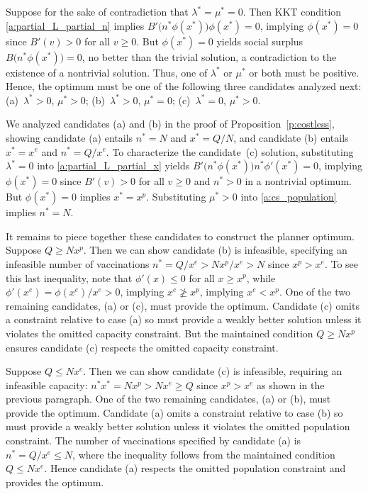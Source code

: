 \documentclass[12pt]{article}
\newcommand{\efficacy}{\phi}
\newcommand{\benefit}{B}
\newcommand{\xunit}{x^{e}}
\newcommand{\xpeak}{x^{p}}
\begin{document}
Suppose for the sake of contradiction that $\lambda^* = \mu^* =
0$. Then KKT condition \eqref{a:partial_L_partial_n} implies
$\benefit' \! \bigl( n^* \efficacy(x^*) \bigr) \efficacy(x^*) = 0$,
implying $\efficacy(x^*) = 0$ since $\benefit'(v) > 0$ for all $v \geq
0$. But $\efficacy(x^*) = 0$ yields social surplus $\benefit \bigl(n^*
\efficacy(x^*) \bigr) = 0$, no better than the trivial solution, a
contradiction to the existence of a nontrivial solution. Thus, one of
$\lambda^*$ or $\mu^*$ or both must be positive. Hence, the optimum
must be one of the following three candidates analyzed next:
(a)~$\lambda^* > 0$, $\mu^* > 0$; (b)~$\lambda^* > 0$, $\mu^* = 0$;
(c)~$\lambda^*=0$, $\mu^* > 0$.

We analyzed candidates (a) and (b) in the proof of
Proposition~\ref{p:costless}, showing candidate (a) entails $n^* = N$
and $x^* = Q/N$, and candidate (b) entails $x^* = \xunit$ and $n^* = Q
/ \xunit$.  To characterize the candidate~(c) solution, substituting
$\lambda^* = 0$ into \eqref{a:partial_L_partial_x} yields $\benefit'
\! \bigl( n^* \efficacy(x^*) \bigr) n^* \efficacy'(x^*) = 0$, implying
$\efficacy(x^*) = 0$ since $\benefit'(v) > 0$ for all $v \geq 0$ and
$n^* >0$ in a nontrivial optimum. But $\efficacy(x^*) = 0$ implies
$x^* = \xpeak$. Substituting $\mu ^* > 0$ into \eqref{a:cs_population}
implies $n^* = N$.

It remains to piece together these candidates to construct the planner
optimum. Suppose $Q \geq N \xpeak$. Then we can show candidate (b) is
infeasible, specifying an infeasible number of vaccinations $n^* = Q /
\xunit > N \xpeak / \xunit > N$ since $\xpeak > \xunit$. To see this
last inequality, note that $\efficacy'(x) \leq 0$ for all $x \geq
\xpeak$, while $\efficacy'(\xunit) = \efficacy(\xunit) / \xunit > 0$,
implying $\xunit \not\geq \xpeak$, implying $\xunit < \xpeak$. One of
the two remaining candidates, (a) or (c), must provide the
optimum. Candidate (c) omits a constraint relative to case (a) so must
provide a weakly better solution unless it violates the omitted
capacity constraint. But the maintained condition $Q \geq N \xpeak$
ensures candidate (c) respects the omitted capacity constraint.

Suppose $Q \leq N \xunit$. Then we can show candidate (c) is
infeasible, requiring an infeasible capacity: $n^* x^* = N \xpeak > N
\xunit \geq Q$ since $\xpeak > \xunit$ as shown in the previous
paragraph. One of the two remaining candidates, (a) or (b), must
provide the optimum. Candidate (a) omits a constraint relative to case
(b) so must provide a weakly better solution unless it violates the
omitted population constraint. The number of vaccinations specified by
candidate (a) is $n^* = Q / \xunit \leq N$, where the inequality
follows from the maintained condition $Q \leq N \xunit$. Hence
candidate (a) respects the omitted population constraint and provides
the optimum.
\end{document}
